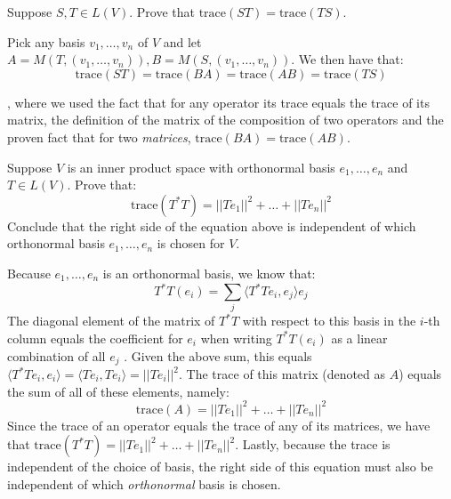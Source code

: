 \begin{exercise}{15}
    Suppose $S, T \in L(V)$. Prove that $\text{trace}(ST) = \text{trace}(TS)$.
\end{exercise}

\begin{solution}

    Pick any basis $v_1, \ldots, v_n$ of $V$ and let $A = M(T, (v_1, \ldots, v_n)), B = M(S, (v_1, \ldots, v_n))$. We then have that:
    $$\text{trace} (ST) = \text{trace} (BA) = \text{trace} (AB) = \text{trace} (TS)$$

    , where we used the fact that for any operator its trace equals the trace of its matrix, the definition of the matrix of the composition of two operators and the proven fact that for two \textit{matrices}, $\text{trace} (BA) = \text{trace} (AB)$.
\end{solution}

\begin{exercise}{18}
    Suppose $V$ is an inner product space with orthonormal basis $e_1, \ldots, e_n$ and $T \in L(V)$. Prove that:
    $$\text{trace} (T^*T) = \lvert \lvert T e_1 \rvert \rvert^2 + \ldots + \lvert \lvert T e_n \rvert \rvert^2$$
    Conclude that the right side of the equation above is independent of which orthonormal basis $e_1, \ldots, e_n$ is chosen for $V$.
\end{exercise}

\begin{solution}

    Because $e_1, \ldots, e_n$ is an orthonormal basis, we know that:
    $$T^*T(e_i) = \sum_{j} \langle T^*Te_i, e_j \rangle e_j$$
    The diagonal element of the matrix of $T^*T$ with respect to this basis in the $i$-th column equals the coefficient for $e_i$ when writing $T^*T(e_i)$  as a linear combination of all $e_j$ . Given the above sum, this equals $\langle T^*T e_i, e_i \rangle = \langle T e_i, T e_i \rangle = \lvert \lvert T e_i \rvert \rvert^2$. The trace of this matrix (denoted as $A$) equals the sum of all of these elements, namely:
    $$\text{trace} (A) = \lvert \lvert Te_1 \rvert \rvert^2 + \ldots + \lvert \lvert Te_n \rvert \rvert^2$$
    Since the trace of an operator equals the trace of any of its matrices, we have that $\text{trace}(T^*T) = \lvert \lvert T e_1 \rvert \rvert^2 + \ldots + \lvert \lvert T e_n \rvert \rvert^2$. Lastly, because the trace is independent of the choice of basis, the right side of this equation must also be independent of which \textit{orthonormal} basis is chosen.
\end{solution}

